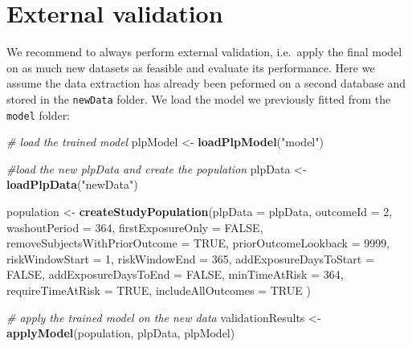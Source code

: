 \documentclass[11pt]{book}
\newenvironment{Shaded}{\begin{snugshade}}{\end{snugshade}}
\newcommand{\KeywordTok}[1]{\textcolor[rgb]{0.13,0.29,0.53}{\textbf{#1}}}
\newcommand{\DataTypeTok}[1]{\textcolor[rgb]{0.13,0.29,0.53}{#1}}
\newcommand{\DecValTok}[1]{\textcolor[rgb]{0.00,0.00,0.81}{#1}}
\newcommand{\StringTok}[1]{\textcolor[rgb]{0.31,0.60,0.02}{#1}}
\newcommand{\CommentTok}[1]{\textcolor[rgb]{0.56,0.35,0.01}{\textit{#1}}}
\newcommand{\OtherTok}[1]{\textcolor[rgb]{0.56,0.35,0.01}{#1}}
\newcommand{\NormalTok}[1]{#1}
\begin{document}
\section{External validation}\label{external-validation}

We recommend to always perform external validation, i.e.~apply the final
model on as much new datasets as feasible and evaluate its performance.
Here we assume the data extraction has already been peformed on a second
database and stored in the \texttt{newData} folder. We load the model we
previously fitted from the \texttt{model} folder:

\begin{Shaded}
\begin{Highlighting}[]
\CommentTok{# load the trained model}
\NormalTok{plpModel <-}\StringTok{ }\KeywordTok{loadPlpModel}\NormalTok{(}\StringTok{"model"}\NormalTok{)}

\CommentTok{#load the new plpData and create the population}
\NormalTok{plpData <-}\StringTok{ }\KeywordTok{loadPlpData}\NormalTok{(}\StringTok{"newData"}\NormalTok{)}

\NormalTok{population <-}\StringTok{ }\KeywordTok{createStudyPopulation}\NormalTok{(}\DataTypeTok{plpData =}\NormalTok{ plpData,}
                                    \DataTypeTok{outcomeId =} \DecValTok{2}\NormalTok{,}
                                    \DataTypeTok{washoutPeriod =} \DecValTok{364}\NormalTok{,}
                                    \DataTypeTok{firstExposureOnly =} \OtherTok{FALSE}\NormalTok{,}
                                    \DataTypeTok{removeSubjectsWithPriorOutcome =} \OtherTok{TRUE}\NormalTok{,}
                                    \DataTypeTok{priorOutcomeLookback =} \DecValTok{9999}\NormalTok{,}
                                    \DataTypeTok{riskWindowStart =} \DecValTok{1}\NormalTok{,}
                                    \DataTypeTok{riskWindowEnd =} \DecValTok{365}\NormalTok{,}
                                    \DataTypeTok{addExposureDaysToStart =} \OtherTok{FALSE}\NormalTok{,}
                                    \DataTypeTok{addExposureDaysToEnd =} \OtherTok{FALSE}\NormalTok{,}
                                    \DataTypeTok{minTimeAtRisk =} \DecValTok{364}\NormalTok{,}
                                    \DataTypeTok{requireTimeAtRisk =} \OtherTok{TRUE}\NormalTok{,}
                                    \DataTypeTok{includeAllOutcomes =} \OtherTok{TRUE}
\NormalTok{)}

\CommentTok{# apply the trained model on the new data}
\NormalTok{validationResults <-}\StringTok{ }\KeywordTok{applyModel}\NormalTok{(population, plpData, plpModel)}
\end{Highlighting}
\end{Shaded}
\end{document}
